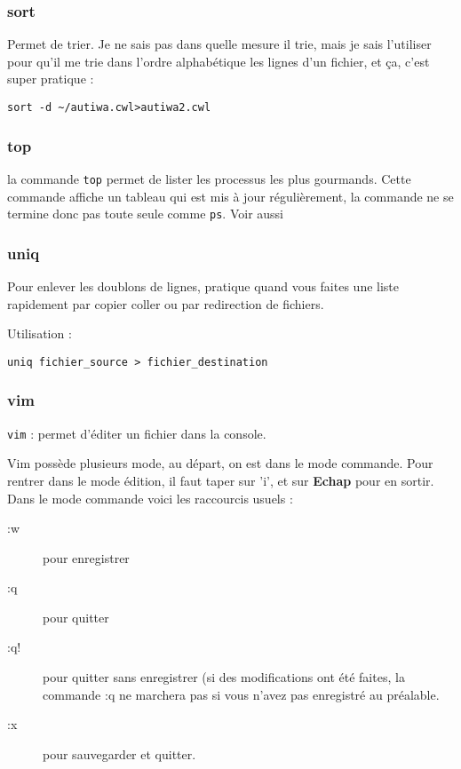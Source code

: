 \documentclass[a4paper,twoside]{article}
\begin{document}
\subsubsection{sort}
Permet de trier. Je ne sais pas dans quelle mesure il trie, mais je sais l'utiliser pour qu'il me trie dans l'ordre alphabétique les lignes d'un fichier, et ça, c'est super pratique :

\begin{verbatim}
sort -d ~/autiwa.cwl>autiwa2.cwl
\end{verbatim}


\subsubsection{top}
la commande \verb|top| permet de lister les processus les plus gourmands. Cette commande affiche un tableau qui est mis à jour régulièrement, la commande ne se termine donc pas toute seule comme \verb|ps|. Voir aussi 

\subsubsection{uniq}
Pour enlever les doublons de lignes, pratique quand vous faites une liste rapidement par copier coller ou par redirection de fichiers.

Utilisation :

\verb|uniq fichier_source > fichier_destination|

\subsubsection{vim}
\verb|vim| : permet d'éditer un fichier dans la console.\par
Vim possède plusieurs mode, au départ, on est dans le mode commande. Pour rentrer dans le mode édition, il faut taper sur 'i', et sur \textbf{Echap} pour en sortir.
Dans le mode commande voici les raccourcis usuels :
\begin{description}
 \item[ :w] pour enregistrer
\item[ :q] pour quitter
\item[ :q!] pour quitter sans enregistrer (si des modifications ont été faites, la commande :q ne marchera pas si vous n'avez pas enregistré au préalable.
\item[ :x] pour sauvegarder et quitter.
\end{description}
\end{document}
